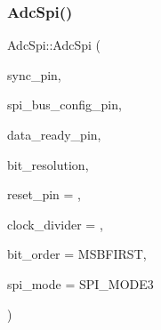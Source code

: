 \subsubsection{\texorpdfstring{Adc\+Spi()}{AdcSpi()}}
{\footnotesize\ttfamily Adc\+Spi\+::\+Adc\+Spi (\begin{DoxyParamCaption}\item[{uint8\+\_\+t}]{sync\+\_\+pin,  }\item[{uint8\+\_\+t}]{spi\+\_\+bus\+\_\+config\+\_\+pin,  }\item[{uint8\+\_\+t}]{data\+\_\+ready\+\_\+pin,  }\item[{uint8\+\_\+t}]{bit\+\_\+resolution,  }\item[{uint8\+\_\+t}]{reset\+\_\+pin = {},  }\item[{uint8\+\_\+t}]{clock\+\_\+divider = {},  }\item[{Bit\+Order}]{bit\+\_\+order = {\ttfamily MSBFIRST},  }\item[{uint8\+\_\+t}]{spi\+\_\+mode = {\ttfamily SPI\+\_\+MODE3} }\end{DoxyParamCaption})}

